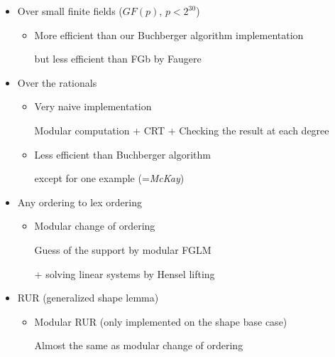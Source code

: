 \begin{slide}{}
\begin{itemize}
\item Over small finite fields ($GF(p)$, $p < 2^{30}$)
\begin{itemize}
\item More efficient than our Buchberger algorithm implementation

but less efficient than FGb by Faugere
\end{itemize}

\item Over the rationals

\begin{itemize}
\item Very naive implementation

Modular computation + CRT + Checking the result at each degree

\item Less efficient than Buchberger algorithm

except for one example (={\it McKay})
\end{itemize}

\end{itemize}
\end{slide}

\begin{slide}{}

\begin{itemize}
\item Any ordering to lex ordering

\begin{itemize}
\item Modular change of ordering

Guess of the support by modular FGLM

+ solving linear systems by Hensel lifting

\end{itemize}

\item RUR (generalized shape lemma)

\begin{itemize}
\item Modular RUR (only implemented on the shape base case)

Almost the same as modular change of ordering
\end{itemize}

\end{itemize}
\end{slide}

